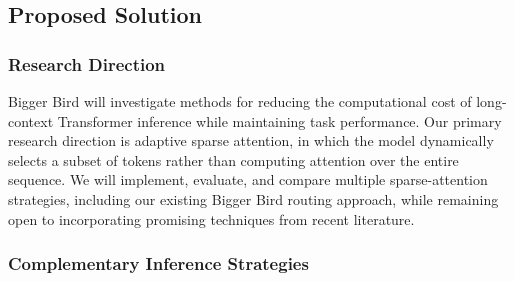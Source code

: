 \documentclass{article}
\begin{document}

\subsection{Proposed Solution} %

\subsubsection{Research Direction}

Bigger Bird will investigate methods for reducing the computational cost of long-context Transformer inference while maintaining task performance. Our primary research direction is adaptive sparse attention, in which the model dynamically selects a subset of tokens rather than computing attention over the entire sequence. We will implement, evaluate, and compare multiple sparse-attention strategies, including our existing Bigger Bird routing approach, while remaining open to incorporating promising techniques from recent literature.

\subsubsection{Complementary Inference Strategies}
\end{document}
